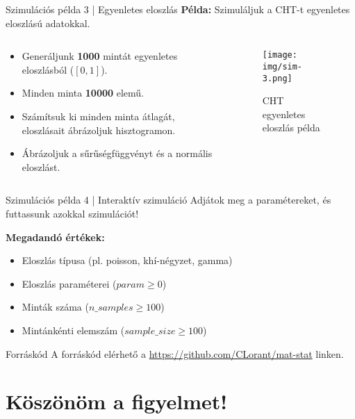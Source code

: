 \documentclass[aspectratio=169,12pt]{beamer}
\begin{document}
	\begin{frame}{Szimulációs példa 3 | Egyenletes eloszlás}
		\textbf{Példa:} Szimuláljuk a CHT-t egyenletes eloszlású adatokkal.
		\begin{columns}
			\begin{column}{0.5\textwidth}
				\begin{itemize}
					\item Generáljunk \textbf{1000} mintát egyenletes eloszlásból (\([0,1]\)).
					\item Minden minta \textbf{10000} elemű.
					\item Számítsuk ki minden minta átlagát, eloszlásait ábrázoljuk hisztogramon.
					\item Ábrázoljuk a sűrűségfüggvényt és a normális eloszlást.
				\end{itemize}
			\end{column}
			\begin{column}{0.5\textwidth}
				\begin{figure}
					\texttt{[image: img/sim-3.png]}
					\caption{CHT egyenletes eloszlás példa}
				\end{figure}
			\end{column}
		\end{columns}
	\end{frame}
	
	\begin{frame}{Szimulációs példa 4 | Interaktív szimuláció}
		Adjátok meg a paramétereket, és futtassunk azokkal szimulációt!
		
		\textbf{Megadandó értékek:}
		\begin{itemize}
			\item Eloszlás típusa (pl. poisson, khí-négyzet, gamma)
			\item Eloszlás paraméterei (\(param \ge 0\))
			\item Minták száma (\(n\_samples \ge 100\))
			\item Mintánkénti elemszám (\(sample\_size \ge 100\))
		\end{itemize}
		
		\begin{block}{Forráskód}
			A forráskód elérhető a \url{https://github.com/CLorant/mat-stat} linken.
		\end{block}
	\end{frame}
	
	\section{Köszönöm a figyelmet!}

	
\end{document}
